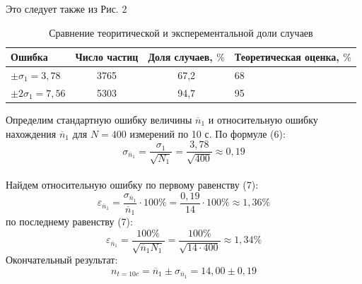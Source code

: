 \documentclass[a4paper,12pt]{article} %
\begin{document}
Это следует также из Рис. 2
\newpage
\begin{table}[h!]
\renewcommand{\tabcolsep}{3mm}
\centering
\caption{Сравнение теоритической и эксперементальной доли случаев}
\label{table 5}
\begin{tabular}{|p{3cm}|c|c|p{3cm}|}
\hline
Ошибка & Число частиц & Доля случаев, $\%$& Теоретическая оценка, $\%$\\ \hline
$\pm\sigma_1= 3,78$ & 3765&67,2 &68\\ \hline
$\pm2\sigma_1= 7,56 $ &5303 &94,7 &95\\ \hline
\end{tabular}
\end{table}
Определим стандартную ошибку величины $\overline{n}_1$ и относительную ошибку нахождения $\overline{n}_1$ для $N = 400$ измерений по 10 с. По формуле (6):
\[\sigma_{\overline{n}_1} = \frac{\sigma_1}{\sqrt{{N}_1}} =\frac{3,78}{\sqrt{400}} \approx 0,19\]\\
Найдем относительную ошибку по первому равенству (7):
\[\varepsilon_{\overline{n}_1} = \frac{\sigma_{\overline{n}_1}}{\overline{n}_1}\cdot 100\% = \frac{0,19}{14} \cdot 100\% \approx 1,36 \%\]
по последнему равенству  (7):
\[\varepsilon_{\overline{n}_1} = \frac{100\%}{\sqrt{\overline{n}_1N_1}} = \frac{100 \%}{\sqrt{14\cdot400}} \approx 1,34\%\]
Окончательный результат:
\[n_{t=10c} = \overline{n}_1 \pm \sigma_{\overline{n}_1} = 14,00 \pm 0,19\]
\end{document}
